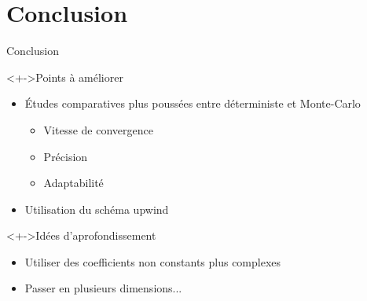 \documentclass[17pt]{beamer}
\newenvironment{blockitemize}[1]{
  \begin{block}<+->{#1}
    \begin{itemize}
    }{
    \end{itemize}
  \end{block}
}
\begin{document}
\section{Conclusion}

\begin{frame}{Conclusion}
  \begin{blockitemize}{Points à améliorer}
  \item Études comparatives plus poussées entre déterministe et Monte-Carlo
    \begin{itemize}
    \item Vitesse de convergence
    \item Précision
    \item Adaptabilité
    \end{itemize}
  \item Utilisation du schéma upwind
  \end{blockitemize}
  \begin{blockitemize}{Idées d'aprofondissement}
  \item Utiliser des coefficients non constants plus complexes
  \item Passer en plusieurs dimensions...
  \end{blockitemize}
  \centering
\end{frame}
\end{document}
